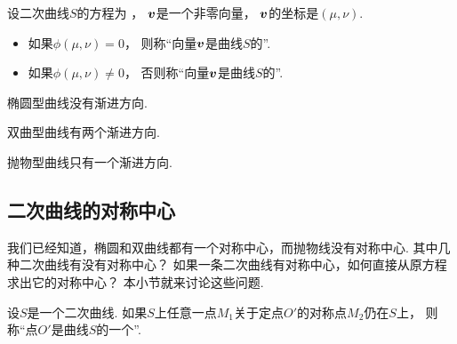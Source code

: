 \begin{definition}
设二次曲线\(S\)的方程为 ，
\(\boldsymbol{v}\)是一个非零向量，
\(\boldsymbol{v}\)的坐标是\((\mu,\nu)\).
\begin{itemize}
	\item 如果\(\phi(\mu,\nu) = 0\)，
	则称“向量\(\boldsymbol{v}\)是曲线\(S\)的”.

	\item 如果\(\phi(\mu,\nu) \neq 0\)，
	否则称“向量\(\boldsymbol{v}\)是曲线\(S\)的”.
\end{itemize}
\end{definition}

\begin{theorem}
椭圆型曲线没有渐进方向.
\end{theorem}

\begin{theorem}
双曲型曲线有两个渐进方向.
\end{theorem}

\begin{theorem}
抛物型曲线只有一个渐进方向.
\end{theorem}

\subsection{二次曲线的对称中心}
我们已经知道，椭圆和双曲线都有一个对称中心，而抛物线没有对称中心.
其中几种二次曲线有没有对称中心？
如果一条二次曲线有对称中心，如何直接从原方程求出它的对称中心？
本小节就来讨论这些问题.

\begin{definition}
设\(S\)是一个二次曲线.
如果\(S\)上任意一点\(M_1\)关于定点\(O'\)的对称点\(M_2\)仍在\(S\)上，
则称“点\(O'\)是曲线\(S\)的一个”.
\end{definition}


